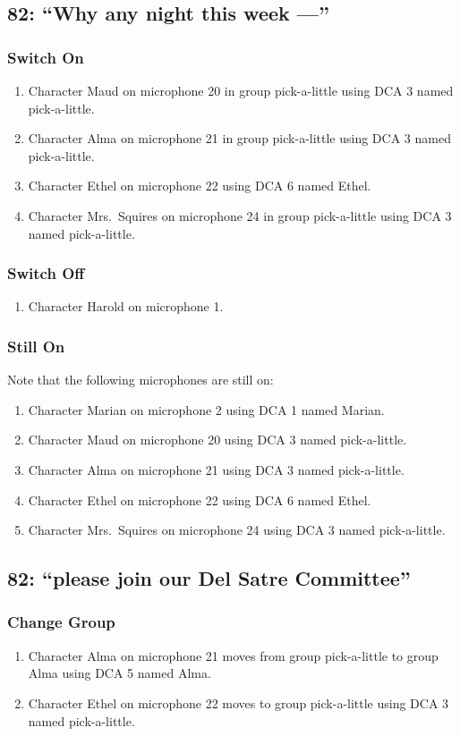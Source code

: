 \subsection* {82: ``Why any night this week ---''}
\subsubsection* {Switch On}
\begin{enumerate}
\item Character Maud on microphone 20 in group pick-a-little using DCA 3 named pick-a-little.
\item Character Alma on microphone 21 in group pick-a-little using DCA 3 named pick-a-little.
\item Character Ethel on microphone 22 using DCA 6 named Ethel.
\item Character Mrs.~Squires on microphone 24 in group pick-a-little using DCA 3 named pick-a-little.
\end{enumerate}
\subsubsection* {Switch Off}
\begin{enumerate}
\item Character Harold on microphone 1.
\end{enumerate}
\subsubsection* {Still On}
Note that the following microphones are still on:
\begin{enumerate}
\item Character Marian on microphone 2 using DCA 1 named Marian.
\item Character Maud on microphone 20 using DCA 3 named pick-a-little.
\item Character Alma on microphone 21 using DCA 3 named pick-a-little.
\item Character Ethel on microphone 22 using DCA 6 named Ethel.
\item Character Mrs.~Squires on microphone 24 using DCA 3 named pick-a-little.
\end{enumerate}
\subsection* {82: ``please join our Del Satre Committee''}
\subsubsection* {Change Group}
\begin{enumerate}
\item Character Alma on microphone 21 moves from group pick-a-little to group Alma using DCA 5 named Alma.
\item Character Ethel on microphone 22 moves to group pick-a-little using DCA 3 named pick-a-little.
\end{enumerate}
